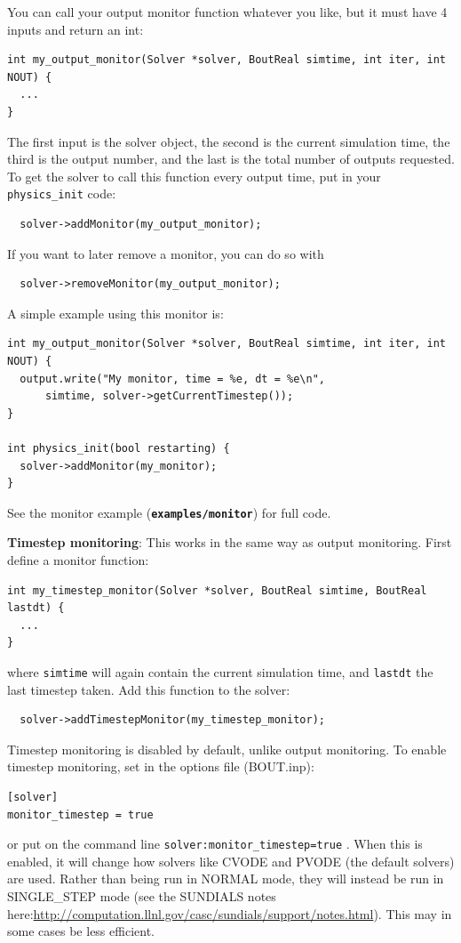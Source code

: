 \documentclass[12pt]{article}
\newcommand{\file}[1]{\texttt{\bf #1}}
\begin{document}
You can call your output monitor function whatever you like, but it must have 4
inputs and return an int:
%
\begin{lstlisting}
int my_output_monitor(Solver *solver, BoutReal simtime, int iter, int NOUT) {
  ...
}
\end{lstlisting}
%
The first input is the solver object, the second is the current simulation
time, the third is the output number, and the last is the total number of
outputs requested. To get the solver to call this function every output time,
put in your
%
\lstinline!physics_init!
%
 code:
%
\begin{lstlisting}
  solver->addMonitor(my_output_monitor);
\end{lstlisting}
%
If you want to later remove a monitor, you can do so with
%
\begin{lstlisting}
  solver->removeMonitor(my_output_monitor);
\end{lstlisting}
%
A simple example using this monitor is:
%
\begin{lstlisting}
int my_output_monitor(Solver *solver, BoutReal simtime, int iter, int NOUT) {
  output.write("My monitor, time = %e, dt = %e\n",
      simtime, solver->getCurrentTimestep());
}

int physics_init(bool restarting) {
  solver->addMonitor(my_monitor);
}
\end{lstlisting}
%
See the monitor example (\file{examples/monitor}) for full code.


{\bf Timestep monitoring}: This works in the same way as output monitoring.
First define a monitor function:
%
\begin{lstlisting}
int my_timestep_monitor(Solver *solver, BoutReal simtime, BoutReal lastdt) {
  ...
}
\end{lstlisting}
%
where
%
\lstinline!simtime!
%
 will again contain the current simulation time, and
%
\lstinline!lastdt!
%
 the last timestep taken. Add this function to the solver:
%
\begin{lstlisting}
  solver->addTimestepMonitor(my_timestep_monitor);
\end{lstlisting}
%
Timestep monitoring is disabled by default, unlike output monitoring. To enable
timestep monitoring, set in the options file (BOUT.inp):
%
\begin{lstlisting}
[solver]
monitor_timestep = true
\end{lstlisting}
%
or put on the command line
%
\lstinline!solver:monitor_timestep=true!
%
. When this is enabled, it will change how solvers like CVODE and PVODE (the
default solvers) are used. Rather than being run in NORMAL mode, they will
instead be run in SINGLE\_STEP mode (see the SUNDIALS notes
here:\url{http://computation.llnl.gov/casc/sundials/support/notes.html}). This
may in some cases be less efficient.
\end{document}
